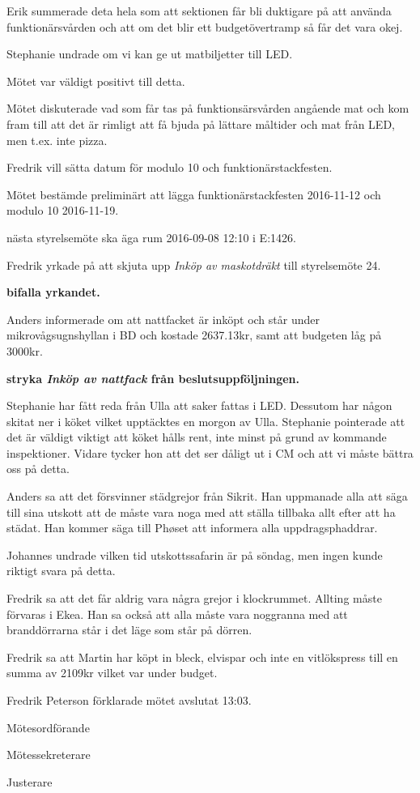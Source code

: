 \documentclass[10pt]{article}
\def\mo{Fredrik Peterson}
\def\ms{Erik Månsson}
\def\ji{Malin Lindström}
\begin{document}
\begin{paragrafer}
Erik summerade deta hela som att sektionen får bli duktigare på att använda funktionärsvården och att om det blir ett budgetövertramp så får det vara okej.

Stephanie undrade om vi kan ge ut matbiljetter till LED.

Mötet var väldigt positivt till detta.

Mötet diskuterade vad som får tas på funktionsärsvården angående mat och kom fram till att det är rimligt att få bjuda på lättare måltider och mat från LED, men t.ex. inte pizza.


Fredrik vill sätta datum för modulo 10 och funktionärstackfesten.

Mötet bestämde preliminärt att lägga funktionärstackfesten 2016-11-12 och modulo 10 2016-11-19.

\Mba nästa styrelsemöte ska äga rum 2016-09-08 12:10 i E:1426.

Fredrik yrkade på att skjuta upp \emph{Inköp av maskotdräkt} till styrelsemöte 24.

\textbf{\Mba bifalla yrkandet.}

Anders informerade om att nattfacket är inköpt och står under mikrovågsugnshyllan i BD och kostade 2637.13kr, samt att budgeten låg på 3000kr.

\textbf{\Mba stryka \emph{Inköp av nattfack} från beslutsuppföljningen.}

Stephanie har fått reda från Ulla att saker fattas i LED. Dessutom har någon skitat ner i köket vilket upptäcktes en morgon av Ulla. Stephanie pointerade att det är väldigt viktigt att köket hålls rent, inte minst på grund av kommande inspektioner. Vidare tycker hon att det ser dåligt ut i CM och att vi måste bättra oss på detta.

Anders sa att det försvinner städgrejor från Sikrit. Han uppmanade alla att säga till sina utskott att de måste vara noga med att ställa tillbaka allt efter att ha städat. Han kommer säga till Phøset att informera alla uppdragsphaddrar.

Johannes undrade vilken tid utskottssafarin är på söndag, men ingen kunde riktigt svara på detta.

Fredrik sa att det får aldrig vara några grejor i klockrummet. Allting måste förvaras i Ekea. Han sa också att alla måste vara noggranna med att branddörrarna står i det läge som står på dörren.

Fredrik sa att Martin har köpt in bleck, elvispar och inte en vitlökspress till en summa av 2109kr vilket var under budget.

{\mo} förklarade mötet avslutat 13:03.

\end{paragrafer}

\hidesignfoot
\begin{signatures}{3}
\signature{\mo}{Mötesordförande}
\signature{\ms}{Mötessekreterare}
\signature{\ji}{Justerare}
\end{signatures}
\end{document}
